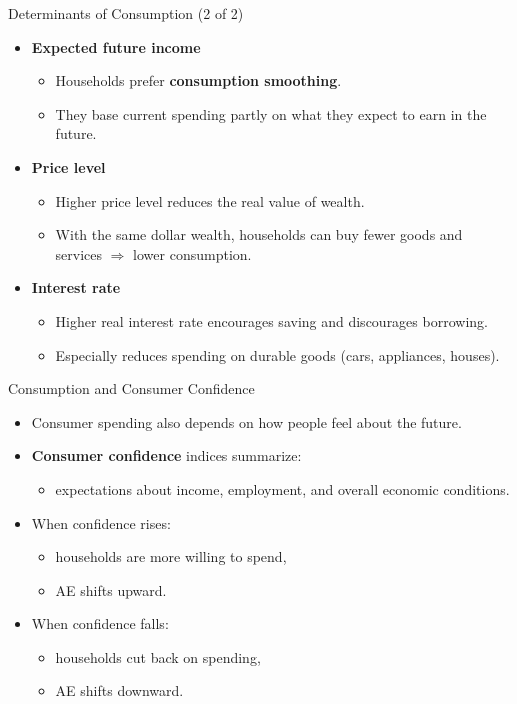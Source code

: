 \documentclass[aspectratio=169]{beamer}
\begin{document}
\begin{frame}{Determinants of Consumption (2 of 2)}
\transfade
\begin{itemize}[<+->]
  \item \textbf{Expected future income}
  \begin{itemize}[<+->]
    \item Households prefer \textbf{consumption smoothing}.
    \item They base current spending partly on what they expect to earn in the future.
  \end{itemize}
  \item \textbf{Price level}
  \begin{itemize}[<+->]
    \item Higher price level reduces the real value of wealth.
    \item With the same dollar wealth, households can buy fewer goods and services \(\Rightarrow\) lower consumption.
  \end{itemize}
  \item \textbf{Interest rate}
  \begin{itemize}[<+->]
    \item Higher real interest rate encourages saving and discourages borrowing.
    \item Especially reduces spending on durable goods (cars, appliances, houses).
  \end{itemize}
\end{itemize}
\end{frame}

\begin{frame}{Consumption and Consumer Confidence}
\transfade
\begin{itemize}[<+->]
  \item Consumer spending also depends on how people feel about the future.
  \item \textbf{Consumer confidence} indices summarize:
  \begin{itemize}[<+->]
    \item expectations about income, employment, and overall economic conditions.
  \end{itemize}
  \item When confidence rises:
  \begin{itemize}[<+->]
    \item households are more willing to spend,
    \item AE shifts upward.
  \end{itemize}
  \item When confidence falls:
  \begin{itemize}[<+->]
    \item households cut back on spending,
    \item AE shifts downward.
  \end{itemize}
\end{itemize}
\end{frame}
\end{document}

